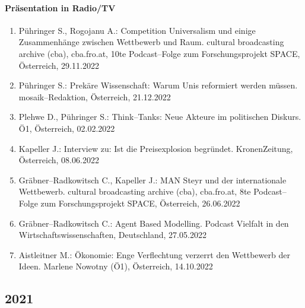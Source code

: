 \paragraph{Präsentation in Radio/TV}
\begin{enumerate}
	\item Pühringer S., Rogojanu A.: Competition Universalism und einige Zusammenhänge zwischen Wettbewerb und Raum. cultural broadcasting archive (cba), cba.fro.at, 10te Podcast--Folge zum Forschungsprojekt SPACE, Österreich, 29.11.2022
	\item Pühringer S.: Prekäre Wissenschaft: Warum Unis reformiert werden müssen. mosaik--Redaktion, Österreich, 21.12.2022
	\item Plehwe D., Pühringer S.: Think--Tanks: Neue Akteure im politischen Diskurs. Ö1, Österreich, 02.02.2022
	\item Kapeller J.: Interview zu: Ist die Preisexplosion begründet. KronenZeitung, Österreich, 08.06.2022
	\item Gräbner--Radkowitsch C., Kapeller J.: MAN Steyr und der internationale Wettbewerb. cultural broadcasting archive (cba), cba.fro.at, 8te Podcast--Folge zum Forschungsprojekt SPACE, Österreich, 26.06.2022
	\item Gräbner--Radkowitsch C.: Agent Based Modelling. Podcast Vielfalt in den Wirtschaftswissenschaften, Deutschland, 27.05.2022
	\item Aistleitner M.: Ökonomie: Enge Verflechtung verzerrt den Wettbewerb der Ideen. Marlene Nowotny (Ö1), Österreich, 14.10.2022
\end{enumerate}
\subsection*{2021}
